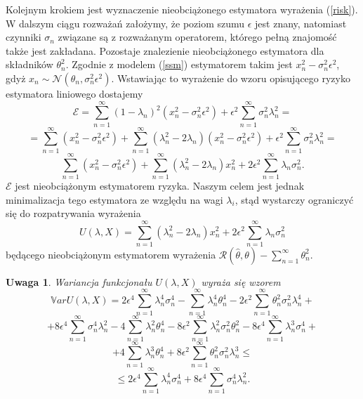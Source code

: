 \documentclass{article}
\newtheorem{uw}{Uwaga}
\begin{document}
Kolejnym krokiem jest wyznaczenie nieobciążonego estymatora wyrażenia (\ref{risk}). W dalszym ciągu rozważań założymy, że poziom szumu $\epsilon$ jest znany, natomiast czynniki $\sigma_n$ związane są z rozważanym operatorem, którego pełną znajomość także jest zakładana. Pozostaje znalezienie nieobciążonego estymatora dla składników $\theta_n^2$. Zgodnie z modelem (\ref{ssm}) estymatorem takim jest $x_n^2-\sigma_n^2\epsilon^2$, gdyż $x_n\sim \mathcal{N}(\theta_n,\sigma_n^2\epsilon^2)$. Wstawiając to wyrażenie do wzoru opisującego ryzyko estymatora liniowego dostajemy
\begin{displaymath}
\mathcal{E}=\sum_{n=1}^{\infty}(1-\lambda_n)^2(x_n^2-\sigma_n^2\epsilon^2)+\epsilon^2\sum_{n=1}^{\infty}\sigma_n^2\lambda_n^2=
\end{displaymath}
\begin{displaymath}
=\sum_{n=1}^{\infty}(x_n^2-\sigma_n^2\epsilon^2)+\sum_{n=1}^{\infty}(\lambda_n^2-2\lambda_n)(x_n^2-\sigma_n^2\epsilon^2)+\epsilon^2\sum_{n=1}^{\infty}\sigma_n^2\lambda_n^2=
\end{displaymath}
\begin{displaymath}
\sum_{n=1}^{\infty}(x_n^2-\sigma_n^2\epsilon^2)+\sum_{n=1}^{\infty}(\lambda_n^2-2\lambda_n)x_n^2+2\epsilon^2\sum_{n=1}^{\infty}\lambda_n\sigma_n^2.
\end{displaymath}
$\mathcal{E}$ jest nieobciążonym estymatorem ryzyka. Naszym celem jest jednak minimalizacja tego estymatora ze względu na wagi $\lambda_i$, stąd wystarczy ograniczyć się do rozpatrywania wyrażenia 
\begin{equation}\label{ure}
U(\lambda,X)=\sum_{n=1}^{\infty}(\lambda_n^2-2\lambda_n)x_n^2+2\epsilon^2\sum_{n=1}^{\infty}\lambda_n\sigma_n^2
\end{equation}
będącego nieobciążonym estymatorem wyrażenia $\mathcal{R}(\hat{\theta},\theta)-\sum_{n=1}^{\infty}\theta_n^2$.
\begin{uw}
Wariancja funkcjonału $U(\lambda,X)$ wyraża się wzorem
\begin{displaymath}
\mathbb{V}ar U(\lambda,X)=2\epsilon^4\sum_{n=1}^{\infty}\lambda_n^4\sigma_n^4-\sum_{n=1}^{\infty}\lambda_n^4\theta_n^4-2\epsilon^2\sum_{n=1}^{\infty}\theta_n^2\sigma_n^2\lambda_n^4+
\end{displaymath}
\begin{displaymath}
+8\epsilon^4\sum_{n=1}^{\infty}\sigma_n^4\lambda_n^2-4\sum_{n=1}^{\infty}\lambda_n^2\theta_n^4-8\epsilon^2\sum_{n=1}^{\infty}\lambda_n^2\sigma_n^2\theta_n^2-8\epsilon^4\sum_{n=1}^{\infty}\lambda_n^3\sigma_n^4+
\end{displaymath}
\begin{displaymath}
+4\sum_{n=1}^{\infty}\lambda_n^3\theta_n^4+8\epsilon^2\sum_{n=1}^{\infty}\theta_n^2\sigma_n^2\lambda_n^3\leq
\end{displaymath}
\begin{displaymath}
\leq 2\epsilon^4\sum_{n=1}^{\infty}\lambda_n^4\sigma_n^4+8\epsilon^4\sum_{n=1}^{\infty}\sigma_n^4\lambda_n^2.
\end{displaymath}
\end{uw}
\end{document}
